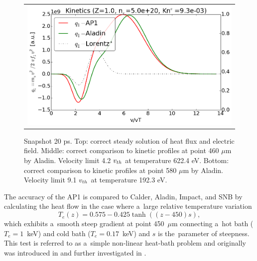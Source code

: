 \begin{figure}[tbh]
\begin{center}
\begin{tabular}{c}
	  \includegraphics[width=\figscale\textwidth]{../VFPdata/C7_Aladin_case5_nonlocal_kinetics.png}
    \end{tabular}
  \caption{  
  Snapshot 20 ps. Top: correct steady solution of heat flux and electric field. 
  Middle: correct comparison to kinetic profiles at point 460 $\mu$m by Aladin. 
  Velocity limit 4.2 $v_{th}$ at temperature 622.4 eV.
  Bottom: correct comparison to kinetic profiles at point 580 $\mu$m by Aladin.
  Velocity limit 9.1 $v_{th}$ at temperature 192.3 eV.
  }
  \label{fig:C7_Aladin_case5}
  \end{center} 
\end{figure}

The accuracy of the AP1 is compared to Calder, Aladin, Impact, and SNB by 
calculating the heat flow in the case
where a~large relative temperature variation
\begin{equation}
  T_e(z) = 0.575 - 0.425 \tanh\left((z-450) s\right) ,
  \label{eq:T_init}
\end{equation}
which exhibits a~smooth steep gradient at point 450~$\mu$m 
connecting a~hot bath ($T_e = 1$~keV) 
and cold bath ($T_e = 0.17$~keV) and $s$ is the~parameter of steepness. 
This test is referred to as a~simple non-linear heat-bath problem and
originally was introduced in \cite{marocchino2013} and further investigated
in  \cite{Sorbo_2015, Sorbo_2016, Sherlock_PoP2017, Brodrick_PoP2017}.

